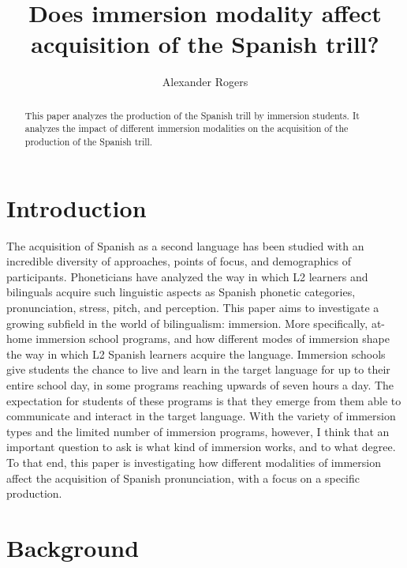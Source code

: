 \documentclass[
  a4paper,
  11pt,
  twocolumn]{article}
\author{}
\date{\vspace{-2.5em}}
\begin{document}
\title{Does immersion modality affect acquisition of the Spanish trill?}
\author{Alexander Rogers}


\maketitle

\begin{abstract}
This paper analyzes the production of the Spanish trill by immersion students. It analyzes the impact of different immersion modalities on the acquisition of the production of the Spanish trill.
\end{abstract}



\section{Introduction}

The acquisition of Spanish as a second language has been studied with an
incredible diversity of approaches, points of focus, and demographics of
participants. Phoneticians have analyzed the way in which L2 learners
and bilinguals acquire such linguistic aspects as Spanish phonetic
categories, pronunciation, stress, pitch, and perception. This paper
aims to investigate a growing subfield in the world of bilingualism:
immersion. More specifically, at-home immersion school programs, and how
different modes of immersion shape the way in which L2 Spanish learners
acquire the language. Immersion schools give students the chance to live
and learn in the target language for up to their entire school day, in
some programs reaching upwards of seven hours a day. The expectation for
students of these programs is that they emerge from them able to
communicate and interact in the target language. With the variety of
immersion types and the limited number of immersion programs, however, I
think that an important question to ask is what kind of immersion works,
and to what degree. To that end, this paper is investigating how
different modalities of immersion affect the acquisition of Spanish
pronunciation, with a focus on a specific production.

\section{Background}
\end{document}
